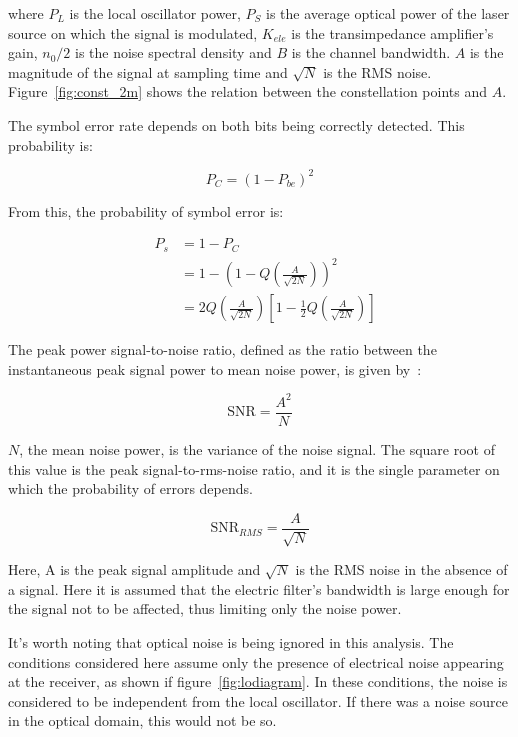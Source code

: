 \begin{refsection}
\noindent where $P_L$ is the local oscillator power, $P_S$ is the average optical power of the laser source on which the signal is modulated, $K_{ele}$ is the transimpedance amplifier's gain, $n_0/2$ is the noise spectral density and $B$ is the channel bandwidth. $A$ is the magnitude of the signal at sampling time and $\sqrt{N}$ is the RMS noise. Figure~\ref{fig:const_2m} shows the relation between the constellation points and $A$.

The symbol error rate depends on both bits being correctly detected. This probability is:

\begin{equation}
P_C = (1 - P_{be})^2
\end{equation}

From this, the probability of symbol error is:

\begin{eqnarray}
&P_s &= 1-P_C \nonumber\\
&	   &= 1 - \left(1 - Q \left({\frac{A}{\sqrt{2N}}}\right)\right)^2 \nonumber \\
&	   &= 2 Q\left({\frac{A}{\sqrt{2N}}}\right)\left[1-\frac{1}{2} Q \left({\frac{A}{\sqrt{2N}}}\right)\right]
\end{eqnarray}


The peak power signal-to-noise ratio, defined as the ratio between the instantaneous peak signal power to mean noise power, is given by~\cite{mischasch}:

\begin{equation}
	\text{SNR} = \frac{A^2}{{N}}
\end{equation}

\noindent 	$N$, the mean noise power, is the variance of the noise signal. The square root of this value is the peak signal-to-rms-noise ratio, and it is the single parameter on which the probability of errors depends.

\begin{equation}
\text{SNR}_{RMS} = \frac{A}{\sqrt{N}}
\end{equation}

Here, A is the peak signal amplitude and $\sqrt{N}$ is the RMS noise in the absence of a signal. Here it is assumed that the electric filter's bandwidth is large enough for the signal not to be affected, thus limiting only the noise power.

It's worth noting that optical noise is being ignored in this analysis. The conditions considered here assume only the presence of electrical noise appearing at the receiver, as shown if figure~\ref{fig:lodiagram}. In these conditions, the noise is considered to be independent from the local oscillator. If there was a noise source in the optical domain, this would not be so.


\end{refsection}

